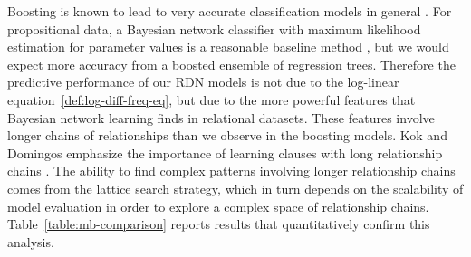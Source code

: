 \documentclass[runningheads,a4paper]{llncs}
\begin{document}
 
Boosting is known to lead to very accurate classification models in general \cite{Bishop2006}. For propositional data, a Bayesian network classifier with maximum likelihood estimation for parameter values is a reasonable baseline method \cite{Grossman2004}, but we would expect more accuracy from a boosted ensemble of regression trees. Therefore the predictive performance of our RDN models is not due to the log-linear equation~\eqref{def:log-diff-freq-eq}, but due to the more powerful features that Bayesian network learning finds in relational datasets. These features involve longer chains of relationships than we observe in the boosting models. Kok and Domingos emphasize the importance of learning clauses with long relationship chains \cite{Kok2010}. The ability to find complex patterns involving longer relationship chains comes from the lattice search strategy, which in turn depends on the scalability of model evaluation in order to explore a complex space of relationship chains. Table~\ref{table:mb-comparison} reports results that quantitatively confirm this analysis. 
\end{document}
